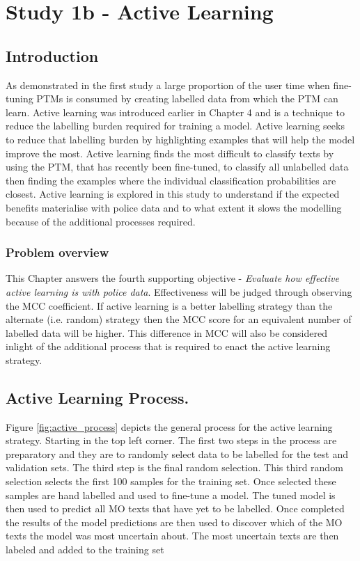 \chapter{Study 1b - Active Learning}


\section{Introduction} As demonstrated in the first study a large proportion of the user time when fine-tuning PTMs is consumed by creating labelled data from which the PTM can learn. Active learning was introduced earlier in Chapter 4 and is a technique to reduce the labelling burden required for training a model. Active learning seeks to reduce that labelling burden by highlighting examples that will help the model improve the most. Active learning finds the most difficult to classify texts by using the PTM, that has recently been fine-tuned, to classify all unlabelled data then finding the examples where the individual classification probabilities are closest. Active learning is explored in this study to understand if the expected benefits materialise with police data and to what extent it slows the modelling because of the additional processes required.

\subsection{Problem overview}

This Chapter answers the fourth supporting objective - \emph{Evaluate how effective active learning is with police data}.  Effectiveness will be judged through observing the MCC coefficient. If active learning is a better labelling strategy than the alternate (i.e. random) strategy then the MCC score for an equivalent number of labelled data will be higher. This difference in MCC will also be considered inlight of the additional process that is required to enact the active learning strategy.

\section{Active Learning Process.} Figure \ref{fig:active_process} depicts the general process for the active learning strategy. Starting in the top left corner. The first two steps in the process are preparatory and they are to randomly select data to be labelled for the test and validation sets. The third step is the final random selection. This third random selection selects the first 100 samples for the training set. Once selected these samples are hand labelled and used to fine-tune a model. The tuned model is then used to predict all MO texts that have yet to be labelled. Once completed the results of the model predictions are then used to discover which of the MO texts the model was most uncertain about. The most uncertain texts are then labeled and added to the training set

